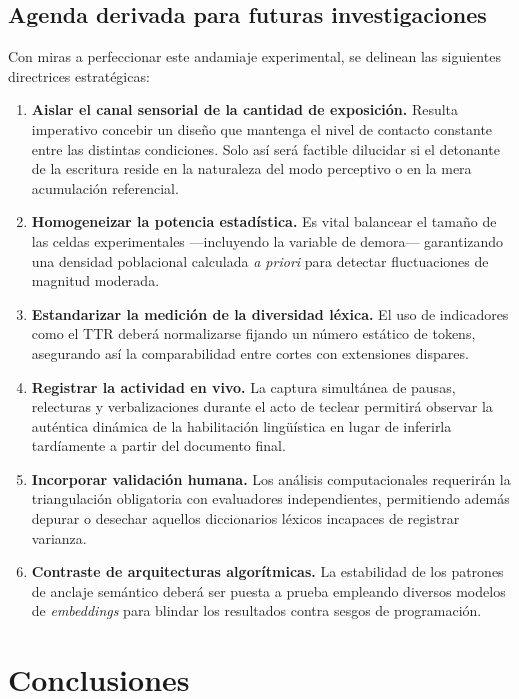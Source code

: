 \documentclass[12pt]{article}
\begin{document}
	\subsection{Agenda derivada para futuras investigaciones}
	
	Con miras a perfeccionar este andamiaje experimental, se delinean las siguientes directrices estratégicas:
	
	\begin{enumerate}
		\item \textbf{Aislar el canal sensorial de la cantidad de exposición.} Resulta imperativo concebir un diseño que mantenga el nivel de contacto constante entre las distintas condiciones. Solo así será factible dilucidar si el detonante de la escritura reside en la naturaleza del modo perceptivo o en la mera acumulación referencial.
		\item \textbf{Homogeneizar la potencia estadística.} Es vital balancear el tamaño de las celdas experimentales —incluyendo la variable de demora— garantizando una densidad poblacional calculada \emph{a priori} para detectar fluctuaciones de magnitud moderada.
		\item \textbf{Estandarizar la medición de la diversidad léxica.} El uso de indicadores como el TTR deberá normalizarse fijando un número estático de tokens, asegurando así la comparabilidad entre cortes con extensiones dispares.
		\item \textbf{Registrar la actividad en vivo.} La captura simultánea de pausas, relecturas y verbalizaciones durante el acto de teclear permitirá observar la auténtica dinámica de la habilitación lingüística en lugar de inferirla tardíamente a partir del documento final.
		\item \textbf{Incorporar validación humana.} Los análisis computacionales requerirán la triangulación obligatoria con evaluadores independientes, permitiendo además depurar o desechar aquellos diccionarios léxicos incapaces de registrar varianza.
		\item \textbf{Contraste de arquitecturas algorítmicas.} La estabilidad de los patrones de anclaje semántico deberá ser puesta a prueba empleando diversos modelos de \emph{embeddings} para blindar los resultados contra sesgos de programación.
	\end{enumerate}
	
	\section{Conclusiones}
	
\end{document}
